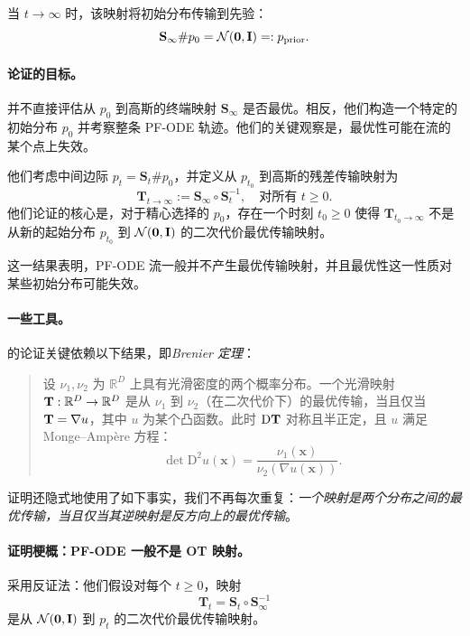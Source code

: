 当 $t \to \infty$ 时，该映射将初始分布传输到先验：
\[
\mathbf{S}_\infty \# p_0 = \mathcal{N}(\bm{0}, {\mathbf{I}}) =: p_{\text{prior}}.
\]
\paragraph{\citet{lavenant2022flow} 论证的目标。}

\citet{lavenant2022flow} 并不直接评估从 $p_0$ 到高斯的终端映射 $\mathbf{S}_\infty$ 是否最优。相反，他们构造一个特定的初始分布 $p_0$ 并考察整条 PF-ODE 轨迹。他们的关键观察是，最优性可能在流的某个点上失效。

他们考虑中间边际 $p_t = \mathbf{S}_t \# p_0$，并定义从 $p_{t_0}$ 到高斯的残差传输映射为
\[
\mathbf{T}_{t \to \infty} := \mathbf{S}_\infty \circ \mathbf{S}_{t}^{-1}, \quad \text{对所有 } t\geq 0.
\]
他们论证的核心是，对于精心选择的 $p_0$，存在一个时刻 $t_0 \geq 0$ 使得 $\mathbf{T}_{t_0 \to \infty}$ 不是从新的起始分布 $p_{t_0}$ 到 $\mathcal{N}(\bm{0}, {\mathbf{I}})$ 的二次代价最优传输映射。

这一结果表明，PF-ODE 流一般并不产生最优传输映射，并且最优性这一性质对某些初始分布可能失效。

\paragraph{一些工具。} \citet{lavenant2022flow} 的论证关键依赖以下结果，即\emph{Brenier 定理}：
\begin{quote}
    \begin{theorem}\label{thm:brenier}
设 $\nu_1, \nu_2$ 为 $\mathbb{R}^D$ 上具有光滑密度的两个概率分布。一个光滑映射 ${\mathbf{T}} : \mathbb{R}^D \to \mathbb{R}^D$ 是从 $\nu_1$ 到 $\nu_2$（在二次代价下）的最优传输，当且仅当 ${\mathbf{T}} = \nabla u$，其中 $u$ 为某个凸函数。此时 $\mathrm{D} {\mathbf{T}}$ 对称且半正定，且 $u$ 满足 Monge–Ampère 方程：
\[
\det \mathrm{D}^2 u(\mathbf{x}) = \frac{\nu_1(\mathbf{x})}{\nu_2(\nabla u(\mathbf{x}))}.
\]
\end{theorem}
\end{quote}

证明还隐式地使用了如下事实，我们不再每次重复：\emph{一个映射是两个分布之间的最优传输，当且仅当其逆映射是反方向上的最优传输}。




\paragraph{证明梗概：PF-ODE 一般不是 OT 映射。} \citet{lavenant2022flow} 采用反证法：他们假设对每个 $t\ge0$，映射
\[
\mathbf{T}_t  =  \mathbf{S}_t \circ \mathbf{S}_\infty^{-1}
\]
是从 $\mathcal{N}(\bm{0},{\mathbf{I}})$ 到 $p_t$ 的二次代价最优传输映射。




